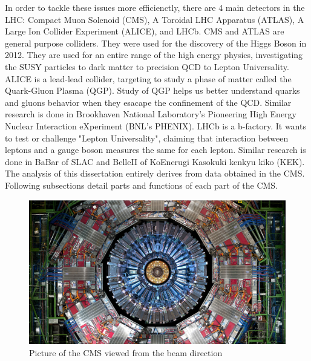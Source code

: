 In order to tackle these issues more efficienctly, there are 4 main detectors in the LHC: Compact Muon Solenoid (CMS), A Toroidal LHC Apparatus (ATLAS), A Large Ion Collider Experiment (ALICE), and LHCb.
CMS and ATLAS are general purpose colliders. They were used for the discovery of the Higgs Boson in 2012. They are used for an entire range of the high energy physics, investigating the SUSY particles to dark matter to precision QCD to Lepton Universality.
ALICE is a lead-lead collider, targeting to study a phase of matter called the Quark-Gluon Plasma (QGP). Study of QGP helps us better understand quarks and gluons behavior when they esacape the confinement of the QCD.
Similar research is done in Brookhaven National Laboratory's Pioneering High Energy Nuclear Interaction eXperiment (BNL's PHENIX).
LHCb is a b-factory. It wants to test or challenge "Lepton Universality", claiming that interaction between leptons and a gauge boson measures the same for each lepton. 
Similar research is done in BaBar of SLAC and BelleII of KoEnerugi Kasokuki kenkyu kiko (KEK).
The analysis of this dissertation entirely derives from data obtained in the CMS.
Following subsections detail parts and functions of each part of the CMS.
\begin{figure}[h!]
	\caption{Picture of the CMS viewed from the beam direction \cite{det}}
  \label{fig:cms}
  \centering
  \includegraphics[width=1.0\linewidth]{figs/cms.png}
\end{figure}

